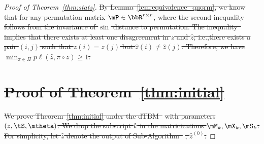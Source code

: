 \documentclass[lettersize,onecolumn,journal]{IEEEtran}
\theoremstyle{definition}
\theoremstyle{definition}
\def\fixme#1#2{\textbf{\color{red}[FIXME (#1): #2]}}
\providecommand{\DIFdeltex}[1]{{\protect\color{red}\sout{#1}}}                      %
\providecommand{\DIFdel}[1]{\texorpdfstring{\DIFdeltex{#1}}{}} %
\begin{document}
\begin{proof}[Proof of Theorem~\ref{thm:stats}]
\DIFdel{By Lemma~\ref{lem:equivalence_qnorm}, we know that for any permutation matrix $\mP \in \bbR^{r \times r}$,
}%
\DIFdel{where the second inequality follows from the invariance of $\sin$ distance to permutation. The inequality~}%
\DIFdel{implies that there exists at least one disagreement in $z$ and $\hat z$; i.e.,there exists a pair $(i,j)$ such that $z(i) = z(j)$ but $\hat z(i) \neq \hat z(j)$. Therefore, we have $\min_{\pi \in \Pi} p\ell(\hat z, \pi \circ z)\geq 1$.
}%


\section*{\DIFdel{Proof of Theorem~\ref{thm:initial}}}
\DIFdel{We prove Theorem~\ref{thm:initial} under the dTBM~}%
\DIFdel{with parameters $(z, \tS, \mtheta)$. We drop the subscript $k$ in the matricizations $\mM_k, \mX_k, \mS_k$. For simplicity, let $\hat z$ denote the output of Sub-Algorithm~}%
\DIFdel{, $\hat z^{(0)}$.
}%


\end{proof}
\end{document}
